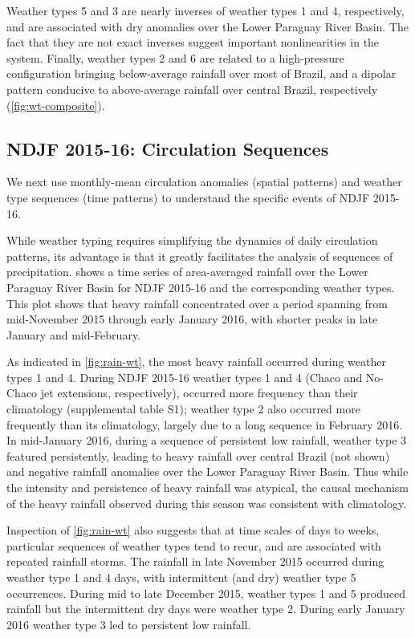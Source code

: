 \documentclass{ametsoc}
\begin{document}
Weather types 5 and 3 are nearly inverses of weather types 1 and 4, respectively, and are associated with dry anomalies over the Lower Paraguay River Basin.
The fact that they are not exact inverses suggest important nonlinearities in the system.
Finally, weather types 2 and 6 are related to a high-pressure configuration bringing below-average rainfall over most of Brazil, and a dipolar pattern conducive to above-average rainfall over central Brazil, respectively (\cref{fig:wt-composite}).

\subsection{NDJF 2015-16: Circulation Sequences}

We next use monthly-mean circulation anomalies (spatial patterns) and weather type sequences (time patterns) to understand the specific events of NDJF 2015-16.

While weather typing requires simplifying the dynamics of daily circulation patterns, its advantage is that it greatly facilitates the analysis of sequences of precipitation.
 shows a time series of area-averaged rainfall over the Lower Paraguay River Basin for NDJF 2015-16 and the corresponding weather types.
This plot shows that heavy rainfall concentrated over a period spanning from mid-November 2015 through early January 2016, with shorter peaks in late January and mid-February.

As indicated in \cref{fig:rain-wt}, the most heavy rainfall occurred during weather types 1 and 4.
During NDJF 2015-16 weather types 1 and 4 (Chaco and No-Chaco jet extensions, respectively),  occurred more frequency than their climatology (supplemental table S1); weather type 2 also occurred more frequently than its climatology, largely due to a long sequence in February 2016.
In mid-January 2016, during a sequence of persistent low rainfall, weather type 3 featured persistently, leading to heavy rainfall over central Brazil (not shown) and negative rainfall anomalies over the Lower Paraguay River Basin.
Thus while the intensity and persistence of heavy rainfall was atypical, the causal mechanism of the heavy rainfall observed during this season was consistent with climatology.

Inspection of \cref{fig:rain-wt} also suggests that at time scales of days to weeks, particular sequences of weather types tend to recur, and are associated with repeated rainfall storms.
The rainfall in late November 2015 occurred during weather type 1 and 4 days, with intermittent (and dry) weather type 5 occurrences.
During mid to late December 2015, weather types 1 and 5 produced rainfall but the intermittent dry days were weather type 2.
During early January 2016 weather type 3 led to persistent low rainfall.
\end{document}
